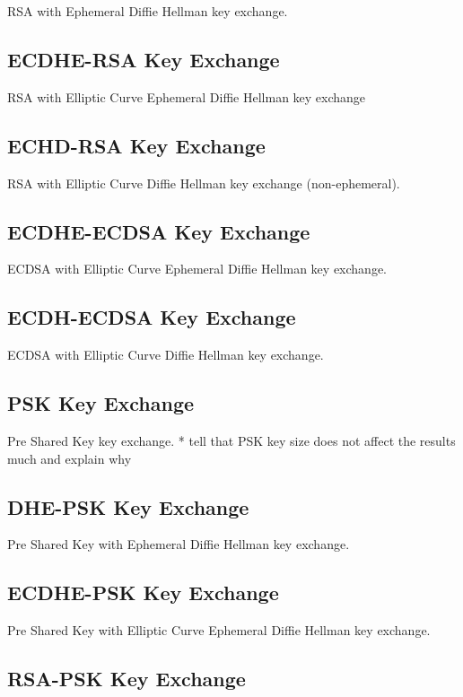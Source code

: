 \documentclass{llncs}
\begin{document}
RSA with Ephemeral Diffie Hellman key exchange.

\subsection{ECDHE-RSA Key Exchange}

RSA with Elliptic Curve Ephemeral Diffie Hellman key exchange

\subsection{ECHD-RSA Key Exchange}

RSA with Elliptic Curve Diffie Hellman key exchange (non-ephemeral).

\subsection{ECDHE-ECDSA Key Exchange}

ECDSA with Elliptic Curve Ephemeral Diffie Hellman key exchange.

\subsection{ECDH-ECDSA Key Exchange}

ECDSA with Elliptic Curve Diffie Hellman key exchange.

\subsection{PSK Key Exchange}

Pre Shared Key key exchange.
* tell that PSK key size does not affect the results much and explain why

\subsection{DHE-PSK Key Exchange}

Pre Shared Key with Ephemeral Diffie Hellman key exchange.

\subsection{ECDHE-PSK Key Exchange}

Pre Shared Key with Elliptic Curve Ephemeral Diffie Hellman key exchange.

\subsection{RSA-PSK Key Exchange}
\end{document}
